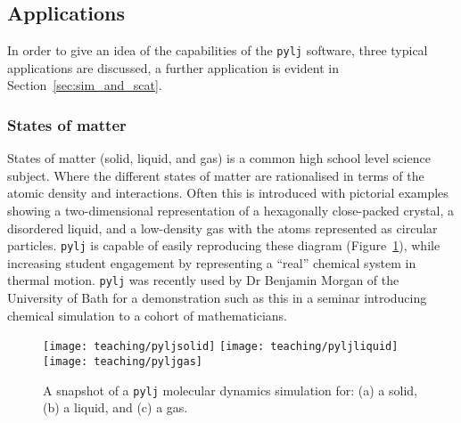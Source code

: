\subsection{Applications}
In order to give an idea of the capabilities of the \texttt{pylj} software, three typical applications are discussed, a further application is evident in Section~\ref{sec:sim_and_scat}.

\subsubsection{States of matter}
States of matter (solid, liquid, and gas) is a common high school level science subject.
Where the different states of matter are rationalised in terms of the atomic density and interactions.
Often this is introduced with pictorial examples showing a two-dimensional representation of a hexagonally close-packed crystal, a disordered liquid, and a low-density gas with the atoms represented as circular particles.
\texttt{pylj} is capable of easily reproducing these diagram (Figure~\ref{fig:matter}), while increasing student engagement by representing a ``real'' chemical system in thermal motion.
\texttt{pylj} was recently used by Dr Benjamin Morgan of the University of Bath for a demonstration such as this in a seminar introducing chemical simulation to a cohort of mathematicians.
%
\begin{figure}
    \centering
    \texttt{[image: teaching/pyljsolid]}
    \texttt{[image: teaching/pyljliquid]}
    \texttt{[image: teaching/pyljgas]}
    \caption{A snapshot of a \texttt{pylj} molecular dynamics simulation for: (a) a solid, (b) a liquid, and (c) a gas.}
    \label{fig:matter}
\end{figure}
%


